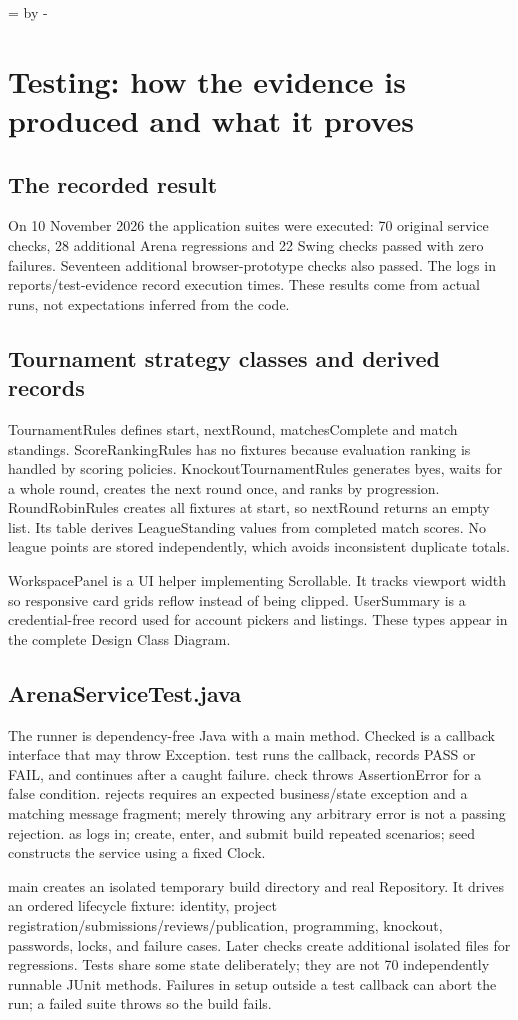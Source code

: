 \documentclass[12pt]{article}
\newcommand{\topic}[1]{\needroom{9\baselineskip}\section{#1}}
\newcommand{\needroom}[1]{\par\begingroup\dimen0=\pagegoal\advance\dimen0 by -\pagetotal\ifdim\dimen0<#1\newpage\fi\endgroup}
\begin{document}
\topic{Testing: how the evidence is produced and what it proves}
\subsection{The recorded result}
On 10 November 2026 the application suites were executed: 70 original service checks, 28 additional Arena regressions and 22 Swing checks passed with zero failures. Seventeen additional browser-prototype checks also passed. The logs in reports/test-evidence record execution times. These results come from actual runs, not expectations inferred from the code.

\subsection{Tournament strategy classes and derived records}
TournamentRules defines start, nextRound, matchesComplete and match standings. ScoreRankingRules has no fixtures because evaluation ranking is handled by scoring policies. KnockoutTournamentRules generates byes, waits for a whole round, creates the next round once, and ranks by progression. RoundRobinRules creates all fixtures at start, so nextRound returns an empty list. Its table derives LeagueStanding values from completed match scores. No league points are stored independently, which avoids inconsistent duplicate totals.

WorkspacePanel is a UI helper implementing Scrollable. It tracks viewport width so responsive card grids reflow instead of being clipped. UserSummary is a credential-free record used for account pickers and listings. These types appear in the complete Design Class Diagram.

\subsection{ArenaServiceTest.java}
The runner is dependency-free Java with a main method. Checked is a callback interface that may throw Exception. test runs the callback, records PASS or FAIL, and continues after a caught failure. check throws AssertionError for a false condition. rejects requires an expected business/state exception and a matching message fragment; merely throwing any arbitrary error is not a passing rejection. as logs in; create, enter, and submit build repeated scenarios; seed constructs the service using a fixed Clock.

main creates an isolated temporary build directory and real Repository. It drives an ordered lifecycle fixture: identity, project registration/submissions/reviews/publication, programming, knockout, passwords, locks, and failure cases. Later checks create additional isolated files for regressions. Tests share some state deliberately; they are not 70 independently runnable JUnit methods. Failures in setup outside a test callback can abort the run; a failed suite throws so the build fails.
\end{document}
